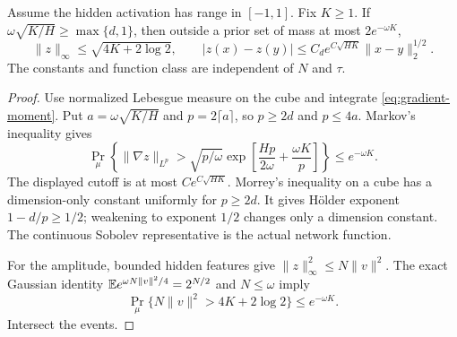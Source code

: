\begin{lemma}
\label{lem:holder-prior}
Assume the hidden activation has range in $[-1,1]$. Fix $K\ge1$. If
$\omega\sqrt{K/H}\ge\max\{d,1\}$, then outside a prior set of mass at most $2e^{-\omega K}$,
\[
 \|z\|_\infty\le\sqrt{4K+2\log2},\qquad
 |z(x)-z(y)|\le C_d e^{C\sqrt{HK}}\|x-y\|_2^{1/2}.
\]
The constants and function class are independent of $N$ and $\tau$.
\end{lemma}
\begin{proof}
Use normalized Lebesgue measure on the cube and integrate \eqref{eq:gradient-moment}. Put $a=\omega\sqrt{K/H}$ and $p=2\lceil a\rceil$, so $p\ge2d$ and $p\le4a$. Markov's inequality gives
\[
 \Pr_\mu\left\{\|\nabla z\|_{L^p}>
 \sqrt{p/\omega}\exp\left[\frac{Hp}{2\omega}
                              +\frac{\omega K}{p}\right]\right\}
 \le e^{-\omega K}.
\]
The displayed cutoff is at most $C e^{C\sqrt{HK}}$. Morrey's inequality on a cube has a dimension-only constant uniformly for $p\ge2d$. It gives H\"older exponent $1-d/p\ge1/2$; weakening to exponent $1/2$ changes only a dimension constant. The continuous Sobolev representative is the actual network function.

For the amplitude, bounded hidden features give $\|z\|_\infty^2\le N\|v\|^2$. The exact Gaussian identity
$\mathbb E e^{\omega N\|v\|^2/4}=2^{N/2}$ and $N\le\omega$ imply
\[
 \Pr_\mu\{N\|v\|^2>4K+2\log2\}\le e^{-\omega K}.
\]
Intersect the events.
\end{proof}

